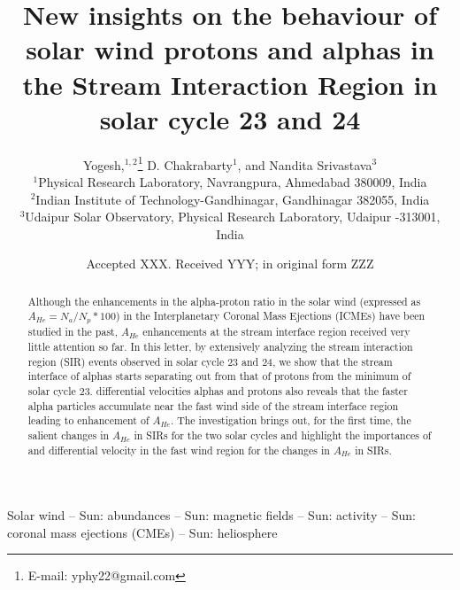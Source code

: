 \documentclass[letters,usenatbib]{mnras}
\title[Helium abundance in SIRs]{New insights on the behaviour of solar wind protons and alphas in the Stream Interaction Region in solar cycle 23 and 24  }
\author[Yogesh et al.]{
Yogesh,$^{1,2}$\thanks{E-mail: yphy22@gmail.com}
D. Chakrabarty$^1$,
and Nandita Srivastava$^3$
\\
$^1$Physical Research Laboratory, Navrangpura, Ahmedabad 380009, India\\
$^{2}$Indian Institute of Technology-Gandhinagar, Gandhinagar 382055, India\\
$^{3}$Udaipur Solar Observatory, Physical Research Laboratory, Udaipur -313001, India
}
\date{Accepted XXX. Received YYY; in original form ZZZ}
\begin{document}
\label{firstpage}
\pagerange{\pageref{firstpage}--\pageref{lastpage}}
\maketitle

\setreviewsoff
\begin{abstract}
Although the enhancements in the alpha-proton ratio in the solar wind (expressed as $A_{He} = N_{a}/N_p*100$) in the Interplanetary Coronal Mass Ejections (ICMEs) have been studied in the past, $A_{He}$ enhancements at the stream interface region received very little attention so far.  In this letter, by extensively analyzing the stream interaction region (SIR) events observed in solar cycle 23 and 24, we show that the stream interface of alphas starts separating out from that of protons from the minimum of solar cycle 23.    differential velocities  alphas and protons also reveals that the faster alpha particles accumulate near the fast wind side of the stream interface region leading to enhancement of $A_{He}$. The investigation brings out, for the first time, the salient changes in $A_{He}$ in SIRs for the two solar cycles and highlight the importances of   and differential velocity  in the fast wind region for the changes in $A_{He}$ in SIRs.  


\end{abstract}

\begin{keywords}
Solar wind -- Sun: abundances -- Sun: magnetic fields -- Sun: activity --  Sun: coronal mass ejections (CMEs) -- Sun: heliosphere
\end{keywords}


\end{document}
